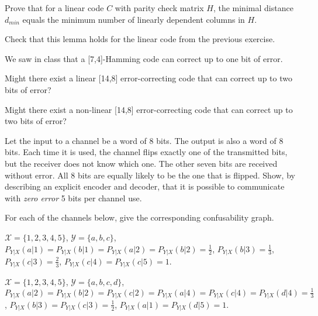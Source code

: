 \documentclass[a4paper,10pt,landscape,twocolumn]{scrartcl}
\begin{document}
\begin{exercise}
Prove that for a linear code $C$ with parity check matrix $H$, the minimal distance $d_{min}$ equals the minimum number of linearly dependent columns in $H$.

Check that this lemma holds for the linear code from the previous exercise.
\end{exercise}


\begin{exercise}
We saw in class that a [7,4]-Hamming code can correct up to one bit of error.
	\begin{subex}
	Might there exist a linear [14,8] error-correcting code that can correct up to two bits of error?
	\end{subex}
	\begin{subex**}
	Might there exist a non-linear [14,8] error-correcting code that can correct up to two bits of error?
	\end{subex**}
\end{exercise}


\begin{exercise}
Let the input to a channel be a word of 8 bits. The output is also a word of 8 bits. Each time it is used, the channel flips exactly one of the transmitted bits, but the receiver does not know which one. The other seven bits are received without error. All 8 bits are equally likely to be the one that is flipped. Show, by describing an explicit encoder and decoder, that it is possible to communicate with \emph{zero error} 5 bits per channel use.
\end{exercise}












\begin{exercise}
For each of the channels below, give the corresponding confusability graph.
	\begin{subex}
	$\mathcal{X} = \{1,2,3,4,5\}$, $\mathcal{Y} = \{a,b,c\}$, $P_{Y|X}(a|1) = P_{Y|X}(b|1) = P_{Y|X}(a|2) = P_{Y|X}(b|2) = \frac{1}{2}$, $P_{Y|X}(b|3) = \frac{1}{3}$, $P_{Y|X}(c|3) = \frac{2}{3}$, $P_{Y|X}(c|4) = P_{Y|X}(c|5) = 1$.
	\end{subex}
	\begin{subex}
	$\mathcal{X} = \{1,2,3,4,5\}$, $\mathcal{Y} = \{a,b,c,d\}$, $P_{Y|X}(a|2) = P_{Y|X}(b|2) = P_{Y|X}(c|2) = P_{Y|X}(a|4) = P_{Y|X}(c|4) = P_{Y|X}(d|4) = \frac{1}{3}$, $P_{Y|X}(b|3) = P_{Y|X}(c|3) = \frac{1}{2}$, $P_{Y|X}(a|1) = P_{Y|X}(d|5) = 1$.
	\end{subex}
\end{exercise}
\end{document}
